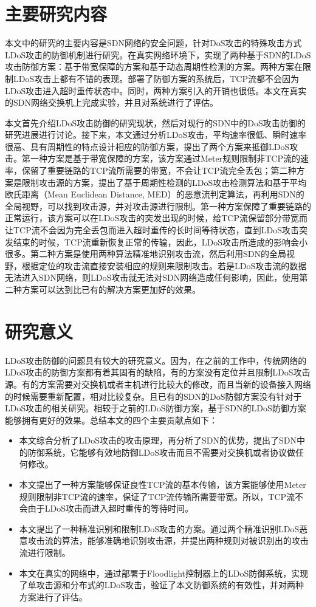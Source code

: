 \section{主要研究内容}
\label{sec:work}
本文中的研究的主要内容是SDN网络的安全问题，针对DoS攻击的特殊攻击方式LDoS攻击的防御机制进行研究。在真实网络环境下，实现了两种基于SDN的LDoS攻击防御方案：基于带宽保障的方案和基于动态周期性检测的方案。两种方案在限制LDoS攻击上都有不错的表现。部署了防御方案的系统后，TCP流都不会因为LDoS攻击进入超时重传状态中。同时，两种方案引入的开销也很低。本文在真实的SDN网络交换机上完成实验，并且对系统进行了评估。

本文首先介绍LDoS攻击防御的研究现状，然后对现行的SDN中的DoS攻击防御的研究进展进行讨论。接下来，本文通过分析LDoS攻击，平均速率很低、瞬时速率很高、具有周期性的特点设计相应的防御方案，提出了两个方案来抵御LDoS攻击。第一种方案是基于带宽保障的方案，该方案通过Meter规则限制非TCP流的速率，保留了重要链路的TCP流所需要的带宽，不会让TCP流完全丢包；第二种方案是限制攻击源的方案，提出了基于周期性检测的LDoS攻击检测算法和基于平均欧氏距离（Mean Euclidean Distance, MED）的恶意流判定算法，再利用SDN的全局视野，可以找到攻击源，并对攻击源进行限制。第一种方案保障了重要链路的正常运行，该方案可以在LDoS攻击的突发出现的时候，给TCP流保留部分带宽而让TCP流不会因为完全丢包而进入超时重传的长时间等待状态，直到LDoS攻击突发结束的时候，TCP流重新恢复正常的传输，因此，LDoS攻击所造成的影响会小很多。第二种方案是使用两种算法精准地识别攻击流，然后利用SDN的全局视野，根据定位的攻击流直接安装相应的规则来限制攻击。若是LDoS攻击流的数据无法进入SDN网络，则LDoS攻击就无法对SDN网络造成任何影响，因此，使用第二种方案可以达到比已有的解决方案更加好的效果。


\section{研究意义}
\label{sec:contribution}
LDoS攻击防御的问题具有较大的研究意义。因为，在之前的工作中，传统网络的LDoS攻击的防御方案都有着其固有的缺陷，有的方案没有定位并且限制LDoS攻击源。有的方案需要对交换机或者主机进行比较大的修改，而且当新的设备接入网络的时候需要重新配置，相对比较复杂。且已有的SDN的DoS防御方案没有针对于LDoS攻击的相关研究。相较于之前的LDoS防御方案，基于SDN的LDoS防御方案能够拥有更好的效果。总结本文的四个主要贡献点如下：

\begin{itemize}
    \item 本文综合分析了LDoS攻击的攻击原理，再分析了SDN的优势，提出了SDN中的防御系统，它能够有效地防御LDoS攻击而且不需要对交换机或者协议做任何修改。
    \item 本文提出了一种方案能够保证良性TCP流的基本传输，该方案能够使用Meter规则限制非TCP流的速率，保证了TCP流传输所需要带宽。所以，TCP流不会由于LDoS攻击而进入超时重传的等待时间。
    \item 本文提出了一种精准识别和限制LDoS攻击的方案。通过两个精准识别LDoS恶意攻击流的算法，能够准确地识别攻击源，并提出两种规则对被识别出的攻击流进行限制。
    \item 本文在真实的网络中，通过部署于Floodlight控制器上的LDoS防御系统，实现了单攻击源和分布式的LDoS攻击，验证了本文防御系统的有效性，并对两种方案进行了评估。
\end{itemize}

